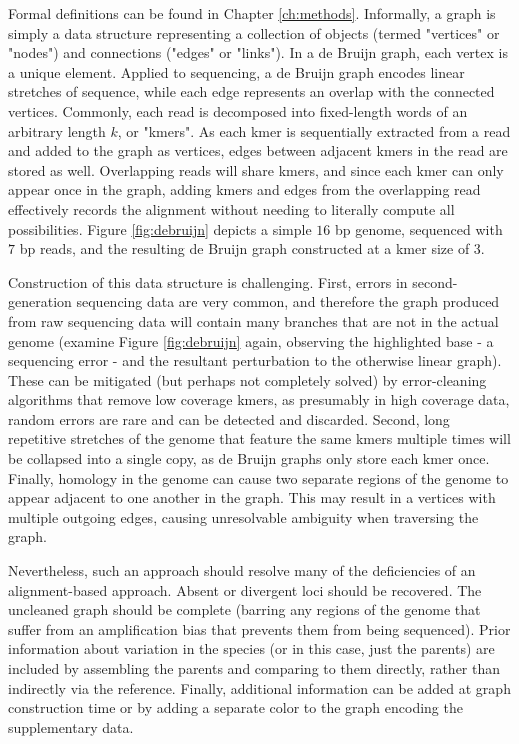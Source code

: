 Formal definitions can be found in Chapter \ref{ch:methods}.  Informally, a graph is simply a data structure representing a collection of objects (termed "vertices" or "nodes") and connections ("edges" or "links").  In a de Bruijn graph, each vertex is a unique element.  Applied to sequencing, a de Bruijn graph encodes linear stretches of sequence, while each edge represents an overlap with the connected vertices.  Commonly, each read is decomposed into fixed-length words of an arbitrary length $k$, or "kmers".  As each kmer is sequentially extracted from a read and added to the graph as vertices, edges between adjacent kmers in the read are stored as well.  Overlapping reads will share kmers, and since each kmer can only appear once in the graph, adding kmers and edges from the overlapping read effectively records the alignment without needing to literally compute all possibilities.  Figure \ref{fig:debruijn} depicts a simple $16$ bp genome, sequenced with $7$ bp reads, and the resulting de Bruijn graph constructed at a kmer size of $3$.

Construction of this data structure is challenging.  First, errors in second-generation sequencing data are very common, and therefore the graph produced from raw sequencing data will contain many branches that are not in the actual genome (examine Figure \ref{fig:debruijn} again, observing the highlighted base - a sequencing error - and the resultant perturbation to the otherwise linear graph).  These can be mitigated (but perhaps not completely solved) by error-cleaning algorithms that remove low coverage kmers, as presumably in high coverage data, random errors are rare and can be detected and discarded.  Second, long repetitive stretches of the genome that feature the same kmers multiple times will be collapsed into a single copy, as de Bruijn graphs only store each kmer once.  Finally, homology in the genome can cause two separate regions of the genome to appear adjacent to one another in the graph.  This may result in a vertices with multiple outgoing edges, causing unresolvable ambiguity when traversing the graph.

Nevertheless, such an approach should resolve many of the deficiencies of an alignment-based approach.  Absent or divergent loci should be recovered.  The uncleaned graph should be complete (barring any regions of the genome that suffer from an amplification bias that prevents them from being sequenced).  Prior information about variation in the species (or in this case, just the parents) are included by assembling the parents and comparing to them directly, rather than indirectly via the reference.  Finally, additional information can be added at graph construction time or by adding a separate color to the graph encoding the supplementary data.

